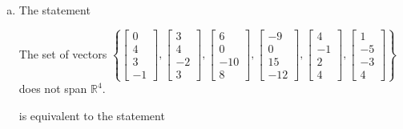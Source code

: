 \begin{exerciseAnswer}
\begin{enumerate}[(a)]
\item The statement 
\begin{center}\begin{minipage}{0.8\textwidth}
 The set of vectors \( \left\{ \left[\begin{array}{c}
0 \\
4 \\
3 \\
-1
\end{array}\right] , \left[\begin{array}{c}
3 \\
4 \\
-2 \\
3
\end{array}\right] , \left[\begin{array}{c}
6 \\
0 \\
-10 \\
8
\end{array}\right] , \left[\begin{array}{c}
-9 \\
0 \\
15 \\
-12
\end{array}\right] , \left[\begin{array}{c}
4 \\
-1 \\
2 \\
4
\end{array}\right] , \left[\begin{array}{c}
1 \\
-5 \\
-3 \\
4
\end{array}\right] \right\} \) does not span \(\mathbb{R}^4\). 
\end{minipage}\end{center}
     is equivalent to the statement 
\begin{center}\begin{minipage}{0.8\textwidth}
 The vector equation \( x_{1} \left[\begin{array}{c}
0 \\
4 \\
3 \\
-1
\end{array}\right] + x_{2} \left[\begin{array}{c}
3 \\
4 \\

\end{array}
\end{minipage}
\end{center}
\end{enumerate}
\end{exerciseAnswer}
